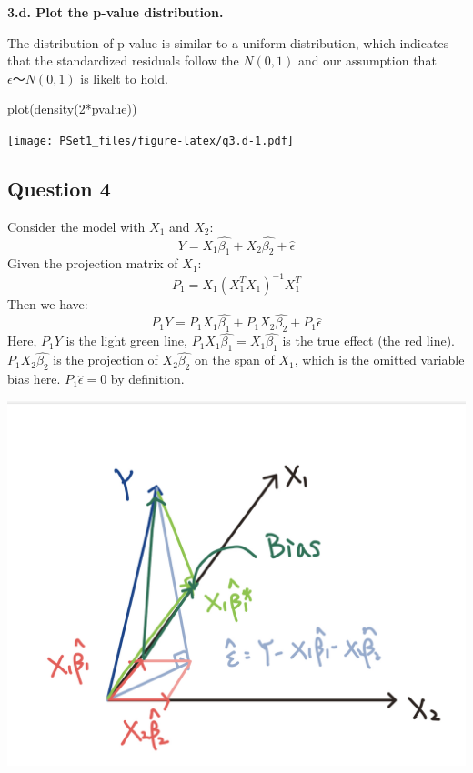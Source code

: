 \documentclass[
]{article}
\newenvironment{Shaded}{\begin{snugshade}}{\end{snugshade}}
\newcommand{\CommentTok}[1]{\textcolor[rgb]{0.56,0.35,0.01}{\textit{#1}}}
\newcommand{\DecValTok}[1]{\textcolor[rgb]{0.00,0.00,0.81}{#1}}
\newcommand{\FunctionTok}[1]{\textcolor[rgb]{0.00,0.00,0.00}{#1}}
\newcommand{\NormalTok}[1]{#1}
\newcommand{\OtherTok}[1]{\textcolor[rgb]{0.56,0.35,0.01}{#1}}
\newcommand{\SpecialCharTok}[1]{\textcolor[rgb]{0.00,0.00,0.00}{#1}}
\begin{document}
\begin{Shaded}
\end{Shaded}

\textbf{3.d. Plot the p-value distribution.}

The distribution of p-value is similar to a uniform distribution, which
indicates that the standardized residuals follow the \(N(0,1)\) and our
assumption that \(\epsilon ～ N(0,1)\) is likelt to hold.

\begin{Shaded}
\begin{Highlighting}[]
\FunctionTok{plot}\NormalTok{(}\FunctionTok{density}\NormalTok{(}\DecValTok{2}\SpecialCharTok{*}\NormalTok{pvalue))}
\end{Highlighting}
\end{Shaded}

\texttt{[image: PSet1\_files/figure-latex/q3.d-1.pdf]}

\hypertarget{question-4}{%
\subsection{Question 4}\label{question-4}}

Consider the model with \(X_1\) and \(X_2\):
\[Y=X_1\hat{\beta_1}+X_2\hat{\beta_2}+\hat{\epsilon}\] Given the
projection matrix of \(X_1\): \[P_1=X_1(X_1^TX_1)^{-1}X_1^T\] Then we
have: \[P_1Y=P_1X_1\hat{\beta_1}+P_1X_2\hat{\beta_2}+P_1\hat{\epsilon}\]
Here, \(P_1Y\) is the light green line,
\(P_1X_1\hat{\beta_1}=X_1\hat{\beta_1}\) is the true effect (the red
line). \(P_1X_2\hat{\beta_2}\) is the projection of \(X_2\hat{\beta_2}\)
on the span of \(X_1\), which is the omitted variable bias here.
\(P_1\hat{\epsilon}=0\) by definition.

\includegraphics{graph_Q4.jpg}
\end{document}
